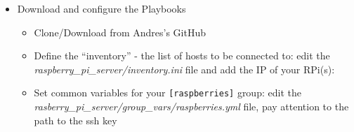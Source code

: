 \begin{itemize}
\item
  Download and configure the Playbooks

  \begin{itemize}
  \tightlist
  \item
    Clone/Download from Andres's GitHub
  \end{itemize}

\begin{Shaded}
\begin{Highlighting}[]
\ExtensionTok{$}
\ExtensionTok{$}
\end{Highlighting}
\end{Shaded}

  \begin{itemize}
  \tightlist
  \item
    Define the ``inventory'' - the list of hosts to be connected to:
    edit the \emph{raspberry\_pi\_server/inventory.ini} file and add the
    IP of your RPi(s):
  \end{itemize}

\begin{Shaded}
\begin{Highlighting}[]
\ExtensionTok{[raspberries]}
\end{Highlighting}
\end{Shaded}

  \begin{itemize}
  \tightlist
  \item
    Set common variables for your \texttt{{[}raspberries{]}} group: edit
    the \emph{rasberry\_pi\_server/group\_vars/raspberries.yml} file,
    pay attention to the path to the ssh key
  \end{itemize}

\begin{Shaded}
\begin{Highlighting}[]
\end{Highlighting}
\end{Shaded}


\end{itemize}
